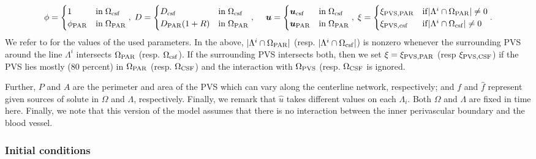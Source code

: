 \documentclass[fleqn,10pt]{wlscirep}
\newcommand{\rami}[1]{\textcolor{blue}{#1}}
\newcommand{\mer}[1]{\textcolor{magenta}{#1}}
\begin{document}
\[
\phi =  \begin{cases}
    1  & \mathrm{in} \;  \Omega_{\rm{csf}} \\ 
    \phi_{\rm{PAR}} & \mathrm{in} \; \Omega_{\rm{PAR}} 
    \end{cases}, \; 
 D= \begin{cases}
    D_{\rm{csf}} & \mathrm{in} \;  \Omega_{\rm{csf}} \\ 
    D_{\rm{PAR}} (1+ R) & \mathrm{in} \; \Omega_{\rm{PAR}} \end{cases}, \; 
    \quad \bm u  = \begin{cases}
    \bm{u}_{\rm{csf}} & \mathrm{in} \; \Omega_{\rm{csf}} \\ 
    \bm{u}_{\rm{PAR}} & \mathrm{in} \; \Omega_{\rm{PAR}} 
\end{cases}, \; 
\xi = \begin{cases}
 \xi_{\rm{PVS}, \rm{PAR}} & \mathrm{if} |\Lambda^i \cap \Omega_{\rm{PAR}}| \neq 0 \\ 
  \xi_{\rm{PVS}, \rm{csf}} & \mathrm{if} |\Lambda^i \cap \Omega_{\rm{csf}}| \neq 0
\end{cases} . 
\]
We refer to  for the values of the used parameters.
In the above,  $|\Lambda^i \cap \Omega_{\rm{PAR}}|$ (resp.  $|\Lambda^i \cap \Omega_{\rm{csf}}|$) is nonzero whenever the surrounding PVS around the line $\Lambda^i$ intersects $\Omega_{\rm{PAR}}$ (resp. $\Omega_{\rm{csf}}$). If the surrounding PVS intersects both, then we set $\xi = \xi_{\mathrm{PVS}, \rm{PAR}}$ (resp $\xi_{\mathrm{PVS}, \rm{CSF}}$) if the PVS lies mostly ($80$ percent) in $\Omega_{\rm{PAR}}$ (resp. $\Omega_{\rm{CSF}}$) and the interaction with $\Omega_{\rm{PVS}}$ (resp. $\Omega_{\rm{CSF}}$ is ignored. 

Further, $P$ and $A$ are the perimeter and area of the PVS which can vary along the centerline network, respectively; and $f$ and $\hat{f}$ represent given sources of solute in $\Omega$ and $\Lambda$, respectively. Finally, we remark that $\hat u$ takes different values on each $\Lambda_i$.  Both $\Omega$ and $\Lambda$ are fixed in time here. Finally, we note that this version of the model assumes that there is no interaction between the inner perivascular boundary and the blood vessel. 

\subsubsection*{Initial conditions}
\end{document}
